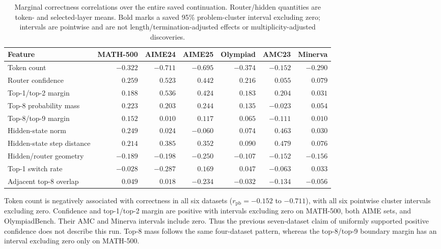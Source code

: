 \begin{table}[t]
\centering
\footnotesize
\caption{Marginal correctness correlations over the entire saved continuation. Router/hidden quantities are token- and selected-layer means. Bold marks a saved 95\% problem-cluster interval excluding zero; intervals are pointwise and are not length/termination-adjusted effects or multiplicity-adjusted discoveries. }
\label{tab:qwen-corr-correct}
\begin{tabular}{@{}lrrrrrr@{}}
\toprule
Feature & MATH-500 & AIME24 & AIME25 & Olympiad & AMC23 & Minerva \\
\midrule
Token count & $\mathbf{-0.322}$ & $\mathbf{-0.711}$ & $\mathbf{-0.695}$ & $\mathbf{-0.374}$ & $\mathbf{-0.152}$ & $\mathbf{-0.290}$ \\
Router confidence & $\mathbf{0.259}$ & $\mathbf{0.523}$ & $\mathbf{0.442}$ & $\mathbf{0.216}$ & $0.055$ & $0.079$ \\
Top-1/top-2 margin & $\mathbf{0.188}$ & $\mathbf{0.536}$ & $\mathbf{0.424}$ & $\mathbf{0.183}$ & $0.204$ & $0.031$ \\
Top-8 probability mass & $\mathbf{0.223}$ & $\mathbf{0.203}$ & $\mathbf{0.244}$ & $\mathbf{0.135}$ & $-0.023$ & $0.054$ \\
Top-8/top-9 margin & $\mathbf{0.152}$ & $0.010$ & $0.117$ & $0.065$ & $-0.111$ & $0.010$ \\
Hidden-state norm & $\mathbf{0.249}$ & $0.024$ & $-0.060$ & $\mathbf{0.074}$ & $\mathbf{0.463}$ & $0.030$ \\
Hidden-state step distance & $\mathbf{0.214}$ & $\mathbf{0.385}$ & $\mathbf{0.352}$ & $\mathbf{0.090}$ & $\mathbf{0.479}$ & $0.076$ \\
Hidden/router geometry & $\mathbf{-0.189}$ & $\mathbf{-0.198}$ & $\mathbf{-0.250}$ & $\mathbf{-0.107}$ & $-0.152$ & $\mathbf{-0.156}$ \\
Top-1 switch rate & $-0.028$ & $\mathbf{-0.287}$ & $0.169$ & $0.047$ & $-0.063$ & $0.033$ \\
Adjacent top-8 overlap & $0.049$ & $0.018$ & $-0.234$ & $-0.032$ & $-0.134$ & $-0.056$ \\
\bottomrule
\end{tabular}
\end{table}

Token count is negatively associated with correctness in all six datasets
($r_{\mathrm{pb}}=-0.152$ to $-0.711$), with all six pointwise cluster intervals
excluding zero. Confidence and top-1/top-2 margin are positive with intervals
excluding zero on MATH-500, both AIME sets, and OlympiadBench. Their AMC and
Minerva intervals include zero. Thus the previous seven-dataset claim of
uniformly supported positive confidence does not describe this run. Top-8
mass follows the same four-dataset pattern, whereas the top-8/top-9 boundary
margin has an interval excluding zero only on MATH-500.

